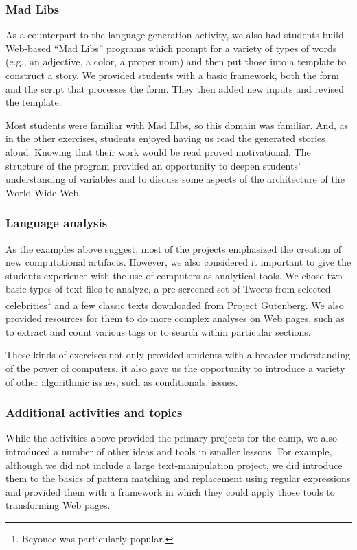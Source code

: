 \subsubsection{Mad Libs}

As a counterpart to the language generation activity, we also had students
build Web-based ``Mad Libs'' programs which prompt for a variety of types
of words (e.g., an adjective, a color, a proper noun) and then put those
into a template to construct a story.  We provided students with a basic
framework, both the form and the script that processes the form.  They
then added new inputs and revised the template.

Most students were familiar with Mad LIbs, so this domain was
familiar.  And, as in the other exercises, students enjoyed having
us read the generated stories aloud.  Knowing that their work would
be read proved motivational.  The structure of the program provided
an opportunity to deepen students' understanding of variables and
to discuss some aspects of the architecture of the World Wide Web.

\subsubsection{Language analysis}

As the examples above suggest, most of the projects emphasized the
creation of new computational artifacts.  However, we also considered
it important to give the students experience with the use of computers
as analytical tools.  We chose two basic types of text files to analyze,
a pre-screened set of Tweets from selected celebrities\footnote{Beyonce
was particularly popular.} and a few classic texts downloaded from
Project Gutenberg.  We also provided resources for them to do more
complex analyses on Web pages, such as to extract and count various
tags or to search within particular sections.

These kinds of exercises not only provided students with a broader 
understanding of the power of computers, it also gave us the opportunity
to introduce a variety of other algorithmic issues, such as conditionals.
issues.

\subsubsection{Additional activities and topics}

While the activities above provided the primary projects for the camp,
we also introduced a number of other ideas and tools in smaller lessons.
For example, although we did not include a large text-manipulation project,
we did introduce them to the basics of pattern matching and
replacement using regular expressions and provided them with a framework
in which they could apply those tools to transforming Web pages.

